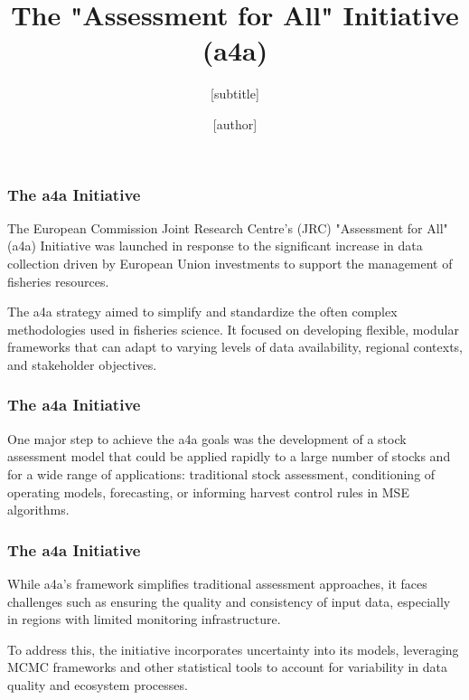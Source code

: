 \documentclass{beamer}
\title{The "Assessment for All" Initiative (a4a)}
\subtitle{[subtitle]}
\author{[author] \\ \normalfont {\scriptsize \href{mailto:jdoe@doe.com}{<[email]>}}}
\institute{[affiliation]}
\begin{document}
	
\begin{frame}
	\titlepage
	
\end{frame}

\begin{frame}
	\frametitle{The a4a Initiative}

The European Commission Joint Research Centre’s (JRC) "Assessment for All" (a4a) Initiative was launched in response to the significant increase in data collection driven by European Union investments to support the management of fisheries resources.

The a4a strategy aimed to simplify and standardize the often complex methodologies used in fisheries science. It focused on developing flexible, modular frameworks that can adapt to varying levels of data availability, regional contexts, and stakeholder objectives.

\end{frame}

\begin{frame}
	\frametitle{The a4a Initiative}

One major step to achieve the a4a goals was the development of a stock assessment model that could be applied rapidly to a large number of stocks and for a wide range of applications: traditional stock assessment, conditioning of operating models, forecasting, or informing harvest control rules in MSE algorithms.

\end{frame}

\begin{frame}
\frametitle{The a4a Initiative}

While a4a's framework simplifies traditional assessment approaches, it faces challenges such as ensuring the quality and consistency of input data, especially in regions with limited monitoring infrastructure.

\bigskip 

To address this, the initiative incorporates uncertainty into its models, leveraging MCMC frameworks and other statistical tools to account for variability in data quality and ecosystem processes.

\end{frame}
\end{document}
